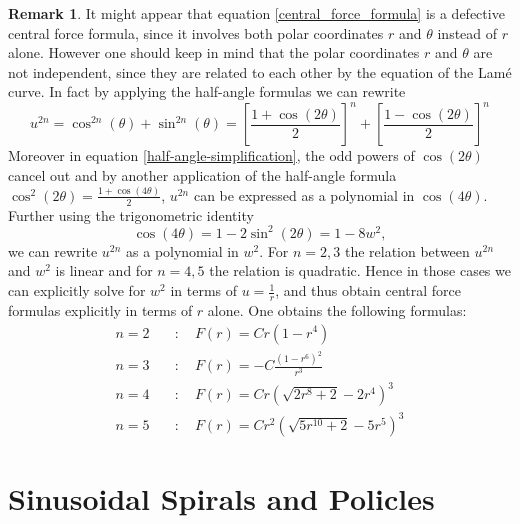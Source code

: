 \documentclass{amsart}
\theoremstyle{definition}
\newtheorem{remark}[theorem]{Remark}
\begin{document}
\begin{remark}
It might appear that equation \eqref{central_force_formula} is a defective central force formula, since it involves both
polar coordinates $r$ and $\theta$ instead of $r$ alone. However one should keep in mind that the polar coordinates
$r$ and $\theta$ are not independent, since they are related to each other by the equation of the Lam\'e curve. In
fact by applying the half-angle formulas we can rewrite
\begin{equation}\label{half-angle-simplification}
u^{2n}=\cos^{2n}(\theta)+\sin^{2n}(\theta)=\left[\frac{1+\cos(2\theta)}{2}\right]^n+\left[\frac{1-\cos(2\theta)}{2}\right]^n
\end{equation}
Moreover in equation \eqref{half-angle-simplification}, the odd powers of $\cos(2\theta)$ cancel out and by another
application of the half-angle formula $\cos^2(2\theta)=\frac{1+\cos(4\theta)}{2}$, $u^{2n}$ can be expressed as a
polynomial in $\cos(4\theta)$. Further using the trigonometric identity 
\[\cos(4\theta)=1-2\sin^2(2\theta)=1-8w^2,\] 
we can rewrite $u^{2n}$ as a polynomial  in $w^2$. For $n=2,3$ the relation between $u^{2n}$ and $w^2$ is linear and for
$n=4,5$ the relation is quadratic. Hence in those cases we can explicitly solve for $w^2$ in terms of $u=\frac{1}{r}$, and
thus obtain central force formulas explicitly in terms of $r$ alone. One obtains the following formulas:
\begin{align*}
n=2 &\quad:\quad F(r)=Cr(1-r^4)\\
n=3 &\quad:\quad F(r)=-C\frac{(1-r^6)^2}{r^3}\\
n=4 &\quad:\quad F(r)=Cr\left(\sqrt{2r^8+2}-2r^4\right)^3\\
n=5 &\quad:\quad F(r)=Cr^2\left(\sqrt{5r^{10}+2}-5r^5\right)^3
\end{align*}
\end{remark}

\bigskip

\section{Sinusoidal Spirals and Policles}
\end{document}
